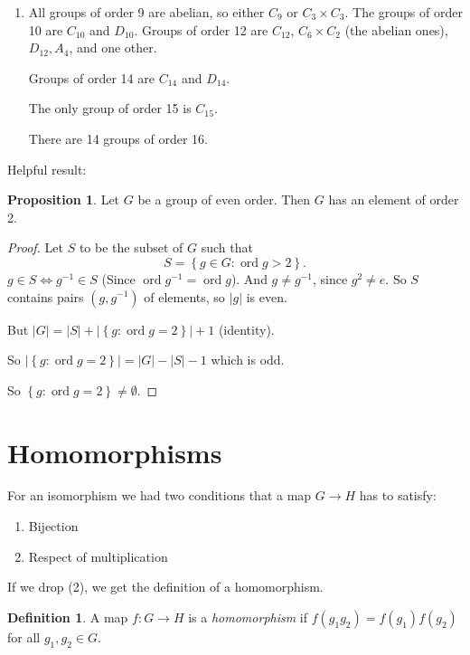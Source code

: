 \documentclass{article}
\theoremstyle{definition}
\newtheorem*{definition}{Definition}
\newtheorem{proposition}[theorem]{Proposition}
\DeclareMathOperator{\ord}{\text{ord}}
\begin{document}
\begin{enumerate}
\item All groups of order 9 are abelian, so either $C_9$ or $C_3 \times C_3$.
  The groups of order 10 are $C_{10}$ and $D_{10}$. Groups of order 12 are $C_{12}$, $ C_{6} \times C_2$ (the abelian ones), $D_{12},A_{4}$, and one other. 

  Groups of order 14 are $C_{14}$ and $D_{14}$. 

  The only group of order 15 is $C_{15}$.

  There are 14 groups of order 16.
\end{enumerate}

Helpful result:
\begin{proposition}
  Let $G$ be a group of even order. Then $G$ has an element of order 2.
\end{proposition}

\begin{proof}
  Let $S$ to be the subset of $G$ such that 
  \begin{equation*}
    S = \left\{ g \in G : \ord g > 2 \right\}.
  \end{equation*}
  $g \in S \iff g^{-1} \in S$ (Since $\ord g^{-1} = \ord g$). And $g \neq g^{-1}$, since $g^2 \neq e$. So $S$ contains pairs $(g,g^{-1})$ of elements, so $|g|$ is even. 

  But $|G|=|S| + |\left\{ g : \ord g=2 \right\}| + 1$ (identity). 

  So $|\left\{ g : \ord g = 2 \right\}|=|G|-|S|-1$ which is odd. 

  So $\left\{ g : \ord g = 2 \right\} \neq \emptyset.$

\end{proof}


\section{Homomorphisms}

For an isomorphism we had two conditions that a map $G \rightarrow H$ has to satisfy:

\begin{enumerate}
  \item Bijection
  \item Respect of multiplication
\end{enumerate}

If we drop (2), we get the definition of a homomorphism.\\

\begin{definition}
  A map $f:G \rightarrow H$ is a \emph{homomorphism} if $f(g_1 g_2)=f(g_1)f(g_2)$ for all $g_1,g_2 \in G.$\\
\end{definition}
\end{document}
